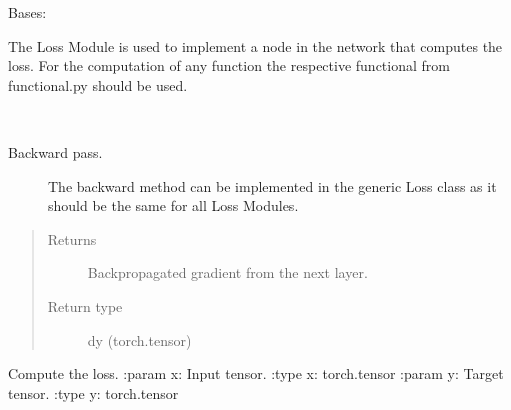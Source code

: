 \documentclass[letterpaper,10pt,english]{sphinxmanual}
\begin{document}
\begin{fulllineitems}
\label{\detokenize{nn:nn.loss.Loss}}
Bases: {\hyperref[\detokenize{nn:nn.module.Module}]{}}

The Loss Module is used to implement a node in the network that computes the loss.
For the computation of any function the respective functional from functional.py should be used.

\begin{fulllineitems}
\label{\detokenize{nn:nn.loss.Loss.backward}}~\begin{description}
\item[{Backward pass.}] \leavevmode
The backward method can be implemented in the generic Loss class
as it should be the same for all Loss Modules.

\end{description}
\begin{quote}\begin{description}
\item[{Returns}] \leavevmode
Backpropagated gradient from the next layer.

\item[{Return type}] \leavevmode
dy (torch.tensor)

\end{description}\end{quote}

\end{fulllineitems}


\begin{fulllineitems}
\label{\detokenize{nn:nn.loss.Loss.forward}}
Compute the loss.
:param x: Input tensor.
:type x: torch.tensor
:param y: Target tensor.
:type y: torch.tensor

\end{fulllineitems}


\end{fulllineitems}
\end{document}
